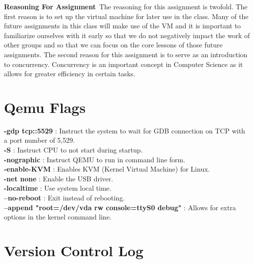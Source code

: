 \documentclass[letterpaper,10pt,draftclsnofoot,titlepage,onecolumn]{IEEEtran}
\begin{document}
	\textbf{Reasoning For Assignment}\
		The reasoning for this assignment is twofold. The first reason is to set up the virtual machine for later use in the class. Many of the future assignments in this class will make use of the VM and it is important to familiarize ourselves with it early so that we do not negatively impact the work of other groups and so that we can focus on the core lessons of those future assignments. The second reason for this assignment is to serve as an introduction to concurrency. Concurrency is an important concept in Computer Science as it allows for greater efficiency in certain tasks.\\
		
	 

	
	\clearpage
	\section{Qemu Flags}
	\textbf{-gdp tcp::5529} : Instruct the system to wait for GDB connection on TCP with a port number of 5,529. \\
	
	\textbf{-S} : Instruct CPU to not start during startup. \\
	
	\textbf{-nographic} : Instruct QEMU to run in command line form. \\
	
	\textbf{-enable-KVM} : Enables KVM (Kernel Virtual Machine) for Linux. \\
	
	\textbf{-net none} : Enable the USB driver. \\
	
	\textbf{-localtime} : Use system local time. \\
	
	\textbf{--no-reboot} : Exit instead of rebooting. \\
	
	\textbf{--append "root=/dev/vda rw console=ttyS0 debug"} : Allows for extra options in the kernel command line. \\
	
	\clearpage
	\section{Version Control Log}
	
\end{document}
